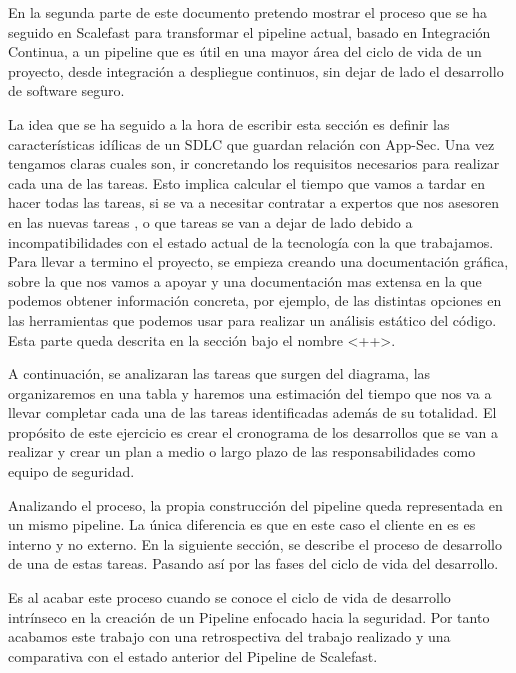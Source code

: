 \documentclass[12pt]{report} %
\begin{document}
En la segunda parte de este documento pretendo mostrar el proceso que se ha
seguido en Scalefast para transformar el pipeline actual, basado en Integración
Continua, a un \gls{pipeline} que es útil en una mayor área del ciclo de vida de
un proyecto, desde integración a despliegue continuos, sin dejar de lado el
desarrollo de software seguro.

La idea que se ha seguido a la hora de escribir esta sección es definir las
características idílicas de un \gls{SDLC} que guardan relación con
\gls{App-Sec}.  Una vez tengamos claras cuales son, ir concretando los
requisitos necesarios para realizar cada una de las tareas.  Esto implica
calcular el tiempo que vamos a tardar en hacer todas las tareas, si se va a
necesitar contratar a expertos que nos asesoren en las nuevas tareas , o que
tareas se van a dejar de lado debido a incompatibilidades con el estado actual
de la tecnología con la que trabajamos.  Para llevar a termino el proyecto, se
empieza creando una documentación gráfica, sobre la que nos vamos a apoyar y una
documentación mas extensa en la que podemos obtener información concreta, por
ejemplo, de las distintas opciones en las herramientas que podemos usar para
realizar un análisis estático del código.
Esta parte queda descrita en la sección bajo el nombre <++>. 

A continuación, se analizaran las tareas que surgen del diagrama, las
organizaremos en una tabla y haremos una estimación del tiempo que nos va a
llevar completar cada una de las tareas identificadas además de su totalidad.
El propósito de este ejercicio es crear el cronograma de los desarrollos que se
van a realizar y crear un plan a medio o largo plazo de las responsabilidades
como equipo de seguridad.


Analizando el proceso, la propia construcción del pipeline queda representada en
un mismo pipeline.  La única diferencia es que en este caso el cliente en es es
interno y no externo. En la siguiente sección, se describe el proceso de
desarrollo de una de estas tareas.  Pasando así por las fases del ciclo de vida
del desarrollo. 

Es al acabar este proceso cuando se conoce el ciclo de vida de desarrollo
intrínseco en la creación de un Pipeline enfocado hacia la seguridad.  Por tanto
acabamos este trabajo con una retrospectiva del trabajo realizado y una
comparativa con el estado anterior del Pipeline de Scalefast.
\end{document}
